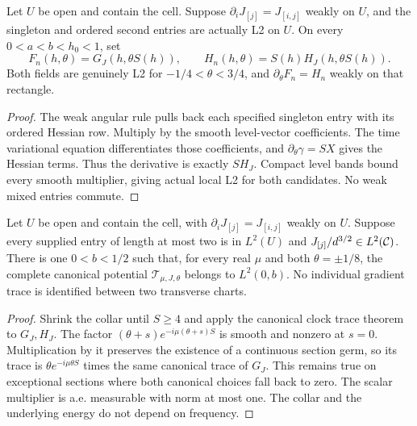 \begin{lemma}
\label{lem:first-bulk-clock-data}
\leanok
Let $U$ be open and contain the cell. Suppose
$\partial_iJ_{[j]}=J_{[i,j]}$ weakly on $U$, and the singleton and ordered
second entries are actually L2 on $U$.
On every $0<a<b<h_0<1$, set
\[
 F_n(h,\theta)=G_J(h,\theta S(h)),\qquad
 H_n(h,\theta)=S(h)H_J(h,\theta S(h)).
\]
Both fields are genuinely L2 for $-1/4<\theta<3/4$, and
$\partial_\theta F_n=H_n$ weakly on that rectangle.
\end{lemma}

\begin{proof}
\leanok
The weak angular rule pulls back each specified singleton entry with its
ordered Hessian row. Multiply by the smooth level-vector coefficients.
The time variational equation differentiates those coefficients, and
$\partial_\theta\gamma=S X$ gives the Hessian terms.
Thus the derivative is exactly $S H_J$.
Compact level bands bound every smooth multiplier, giving actual local L2
for both candidates. No weak mixed entries commute.
\end{proof}

\begin{lemma}
\label{lem:first-bulk-endpoint-energy}
\leanok
Let $U$ be open and contain the cell, with
$\partial_iJ_{[j]}=J_{[i,j]}$ weakly on $U$.
Suppose every supplied entry of length at most two is in $L^2(U)$ and
$J_{[j]}/d^{3/2}\in L^2(\mathcal{C})$.
There is one $0<b<1/2$ such that, for every real $\mu$ and both
$\theta=\pm1/8$, the complete canonical potential
$\mathcal T_{\mu,J,\theta}$ belongs to $L^2(0,b)$.
No individual gradient trace is identified between two transverse charts.
\end{lemma}

\begin{proof}
\leanok
Shrink the collar until $S\ge4$ and apply the canonical clock trace theorem
to $G_J,H_J$.
The factor $(\theta+s)e^{-i\mu(\theta+s)S}$ is smooth and nonzero at $s=0$.
Multiplication by it preserves the existence of a continuous section germ,
so its trace is $\theta e^{-i\mu\theta S}$ times the same canonical trace of $G_J$.
This remains true on exceptional sections where both canonical choices fall
back to zero. The scalar multiplier is a.e. measurable with norm at most one.
The collar and the underlying energy do not depend on frequency.
\end{proof}

